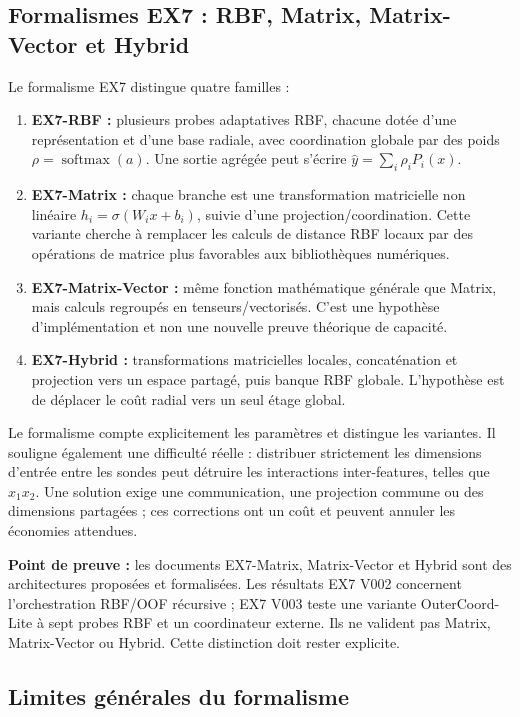 \documentclass[11pt,a4paper]{article}
\newcommand{\important}[1]{\textbf{#1}}
\begin{document}
\subsection{Formalismes EX7 : RBF, Matrix, Matrix-Vector et Hybrid}

Le formalisme EX7 distingue quatre familles :
\begin{enumerate}
  \item \textbf{EX7-RBF :} plusieurs probes adaptatives RBF, chacune dotée d'une représentation et d'une base radiale, avec coordination globale par des poids \(\rho=\operatorname{softmax}(a)\). Une sortie agrégée peut s'écrire \(\widehat y=\sum_i\rho_i P_i(x)\).
  \item \textbf{EX7-Matrix :} chaque branche est une transformation matricielle non linéaire \(h_i=\sigma(W_i x+b_i)\), suivie d'une projection/coordination. Cette variante cherche à remplacer les calculs de distance RBF locaux par des opérations de matrice plus favorables aux bibliothèques numériques.
  \item \textbf{EX7-Matrix-Vector :} même fonction mathématique générale que Matrix, mais calculs regroupés en tenseurs/vectorisés. C'est une hypothèse d'implémentation et non une nouvelle preuve théorique de capacité.
  \item \textbf{EX7-Hybrid :} transformations matricielles locales, concaténation et projection vers un espace partagé, puis banque RBF globale. L'hypothèse est de déplacer le coût radial vers un seul étage global.
\end{enumerate}

Le formalisme compte explicitement les paramètres et distingue les variantes. Il souligne également une difficulté réelle : distribuer strictement les dimensions d'entrée entre les sondes peut détruire les interactions inter-features, telles que \(x_1x_2\). Une solution exige une communication, une projection commune ou des dimensions partagées ; ces corrections ont un coût et peuvent annuler les économies attendues.

\important{Point de preuve :} les documents EX7-Matrix, Matrix-Vector et Hybrid sont des architectures proposées et formalisées. Les résultats EX7 V002 concernent l'orchestration RBF/OOF récursive ; EX7 V003 teste une variante OuterCoord-Lite à sept probes RBF et un coordinateur externe. Ils ne valident pas Matrix, Matrix-Vector ou Hybrid. Cette distinction doit rester explicite.

\subsection{Limites générales du formalisme}
\end{document}
